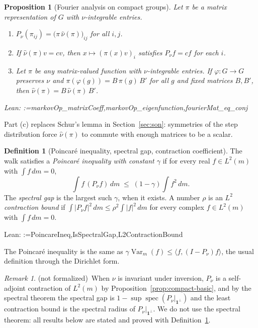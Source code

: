 \documentclass[11pt]{amsart}
\makeatletter
\newtheorem{proposition}[theorem]{Proposition}
\theoremstyle{definition}
\newtheorem{definition}[theorem]{Definition}
\theoremstyle{remark}
\newtheorem{remark}[theorem]{Remark}
\newcommand{\@leanlist}[1]{\def\@leansep{}\@for\@leanname:=#1\do{\@leansep
  \texttt{\expandafter\detokenize\expandafter{\@leanname}}\def\@leansep{, }}}
\newcommand{\lean}[1]{\par\smallskip\noindent
  {\footnotesize\normalfont\raggedright\textsf{Lean:} \@leanlist{#1}\par}}
\newcommand{\notformal}{\textup{(not formalized)}}
\newcommand{\one}{\mathbf{1}}
\newcommand{\ip}[2]{\langle #1,#2\rangle}
\makeatother
\begin{document}
\begin{proposition}[Fourier analysis on compact groups]\label{prop:compact-fourier}
Let $\pi$ be a matrix representation of $G$ with $\nu$-integrable entries.
\begin{enumerate}
\item[(a)] $P_\nu(\pi_{ij})=\bigl(\pi\,\hat\nu(\pi)\bigr)_{ij}$ for all $i,j$.
\item[(b)] If $\hat\nu(\pi)v=cv$, then $x\mapsto(\pi(x)v)_i$ satisfies $P_\nu f=cf$ for each $i$.
\item[(c)] Let $\pi$ be any matrix-valued function with $\nu$-integrable entries.  If
$\varphi\colon G\to G$ preserves $\nu$ and $\pi(\varphi(g))=B\,\pi(g)\,B'$ for all $g$ and fixed
matrices $B,B'$, then $\hat\nu(\pi)=B\,\hat\nu(\pi)\,B'$.
\end{enumerate}
\lean{markovOp_matrixCoeff,markovOp_eigenfunction,fourierMat_eq_conj}
\end{proposition}

Part (c) replaces Schur's lemma in Section~\ref{sec:son}: symmetries of the step distribution
force $\hat\nu(\pi)$ to commute with enough matrices to be a scalar.

\begin{definition}[Poincar\'e inequality, spectral gap, contraction coefficient]\label{def:gap}
The walk satisfies a \emph{Poincar\'e inequality with constant $\gamma$} if for every real
$f\in L^2(m)$ with $\int f\,dm=0$,
\[
  \int f\,(P_\nu f)\,dm\;\le\;(1-\gamma)\int f^2\,dm .
\]
The \emph{spectral gap} is the largest such $\gamma$, when it exists.  A number $\rho$ is an
\emph{$L^2$ contraction bound} if $\int|P_\nu f|^2\,dm\le\rho^2\int|f|^2\,dm$ for every complex
$f\in L^2(m)$ with $\int f\,dm=0$.
\lean{PoincareIneq,IsSpectralGap,L2ContractionBound}
\end{definition}

The Poincar\'e inequality is the same as $\gamma\operatorname{Var}_m(f)\le\ip{f}{(I-P_\nu)f}$,
the usual definition through the Dirichlet form.

\begin{remark}\label{rem:selfadjoint}
\notformal\ When $\nu$ is invariant under inversion, $P_\nu$ is a self-adjoint contraction of
$L^2(m)$ by Proposition~\ref{prop:compact-basic}, and by the spectral theorem the spectral gap
is $1-\sup\operatorname{spec}(P_\nu|_{\one^\perp})$ and the least contraction bound is the
spectral radius of $P_\nu|_{\one^\perp}$.  We do not use the spectral theorem: all results below
are stated and proved with Definition~\ref{def:gap}.
\end{remark}
\end{document}
